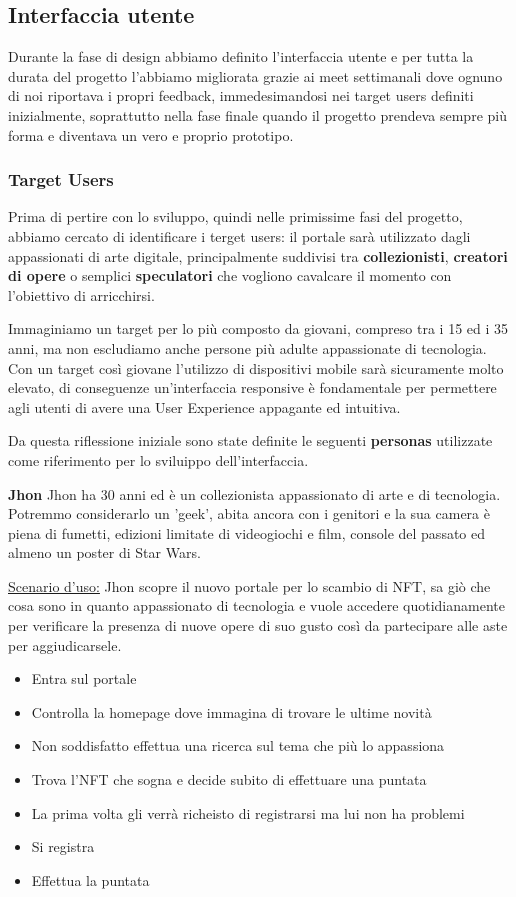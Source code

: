 \clearpage

\subsection{Interfaccia utente}
Durante la fase di design abbiamo definito l'interfaccia utente 
e per tutta la durata del progetto l'abbiamo migliorata grazie ai meet settimanali dove ognuno di noi riportava i propri feedback,
immedesimandosi nei target users definiti inizialmente,
soprattutto nella fase finale quando il progetto prendeva sempre più forma e diventava un vero e proprio prototipo.

\subsubsection{Target Users}
Prima di pertire con lo sviluppo, quindi nelle primissime fasi del progetto, abbiamo cercato di identificare i terget users:
il portale sarà utilizzato dagli appassionati di arte digitale, principalmente suddivisi tra \textbf{collezionisti}, \textbf{creatori di opere} 
o semplici \textbf{speculatori} che vogliono cavalcare il momento con l'obiettivo di arricchirsi.

Immaginiamo un target per lo più composto da giovani, compreso tra i 15 ed i 35 anni, ma non escludiamo anche persone più adulte appassionate di tecnologia.
Con un target così giovane l'utilizzo di dispositivi mobile sarà sicuramente molto elevato,
di conseguenze un'interfaccia responsive è fondamentale per permettere agli utenti di avere una User Experience appagante ed intuitiva. 

Da questa riflessione iniziale sono state definite le seguenti \textbf{personas} utilizzate come riferimento per lo sviluippo dell'interfaccia.

\bigbreak
\noindent
\textbf{Jhon}
\bigbreak
\noindent
Jhon ha 30 anni ed è un collezionista appassionato di arte e di tecnologia. 
Potremmo considerarlo un 'geek', abita ancora con i genitori e la sua camera è piena di fumetti, 
edizioni limitate di videogiochi e film, console del passato ed almeno un poster di Star Wars.

\underline{Scenario d'uso:}
Jhon scopre il nuovo portale per lo scambio di NFT, 
sa giò che cosa sono in quanto appassionato di tecnologia 
e vuole accedere quotidianamente per verificare la presenza di nuove opere di suo gusto
così da partecipare alle aste per aggiudicarsele.

\begin{itemize}
	\item Entra sul portale
	\item Controlla la homepage dove immagina di trovare le ultime novità
	\item Non soddisfatto effettua una ricerca sul tema che più lo appassiona
	\item Trova l'NFT che sogna e decide subito di effettuare una puntata
	\item La prima volta gli verrà richeisto di registrarsi ma lui non ha problemi 
	\item Si registra 
	\item Effettua la puntata
\end{itemize}

